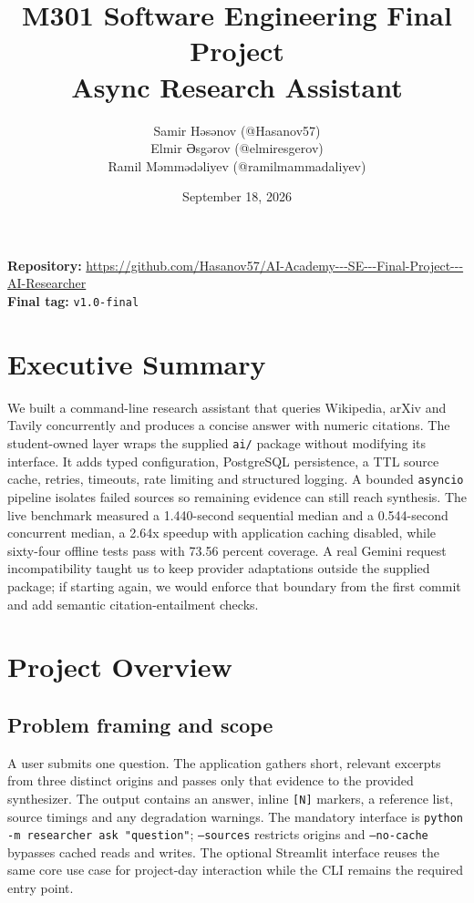 \documentclass[11pt,a4paper]{article}
\title{M301 Software Engineering Final Project\\Async Research Assistant}
\author{Samir Həsənov (@Hasanov57) \\
Elmir Əsgərov (@elmiresgerov) \\
Ramil Məmmədəliyev (@ramilmammadaliyev)}
\date{September 18, 2026}
\begin{document}
\maketitle

\begin{center}
\textbf{Repository:} \url{https://github.com/Hasanov57/AI-Academy---SE---Final-Project---AI-Researcher}\\
\textbf{Final tag:} \texttt{v1.0-final}
\end{center}

\section*{Executive Summary}
We built a command-line research assistant that queries Wikipedia, arXiv and Tavily concurrently
and produces a concise answer with numeric citations. The student-owned layer wraps the supplied
\texttt{ai/} package without modifying its interface. It adds typed configuration, PostgreSQL
persistence, a TTL source cache, retries, timeouts, rate limiting and structured logging. A bounded
\texttt{asyncio} pipeline isolates failed sources so remaining evidence can still reach synthesis.
The live benchmark measured a 1.440-second sequential median and a 0.544-second concurrent
median, a 2.64x speedup with application caching disabled, while sixty-four offline tests pass with
73.56 percent coverage. A real Gemini request incompatibility taught us to keep provider
adaptations outside the supplied package; if starting again, we would enforce that boundary from
the first commit and add semantic citation-entailment checks.

\tableofcontents

\section{Project Overview}
\subsection{Problem framing and scope}
A user submits one question. The application gathers short, relevant excerpts from three distinct
origins and passes only that evidence to the provided synthesizer. The output contains an answer,
inline \texttt{[N]} markers, a reference list, source timings and any degradation warnings. The
mandatory interface is \texttt{python -m researcher ask "question"}; \texttt{--sources} restricts
origins and \texttt{--no-cache} bypasses cached reads and writes. The optional Streamlit interface
reuses the same core use case for project-day interaction while the CLI remains the required entry point.
\end{document}
